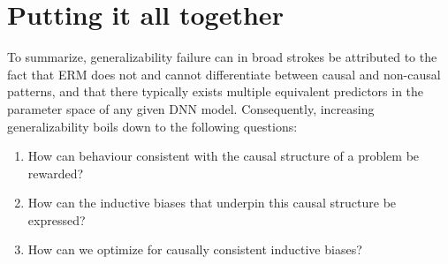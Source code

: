 \section{Putting it all together}
	To summarize, generalizability failure can in broad strokes be attributed to the fact that ERM does not and cannot differentiate between causal and non-causal patterns, and that there typically exists multiple equivalent predictors in the parameter space of any given DNN model. Consequently, increasing generalizability boils down to the following questions:
	\begin{enumerate}
		\item How can behaviour consistent with the causal structure of a problem be rewarded? \label{loss}
		\item How can the inductive biases that underpin this causal structure be expressed? \label{mnv}
		\item How can we optimize for causally consistent inductive biases?\label{training}
	\end{enumerate}
	